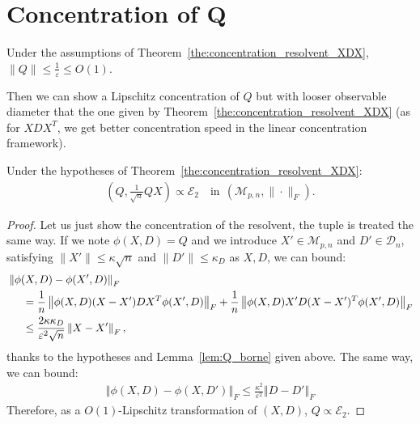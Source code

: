 \documentclass[a4papaer, titlepage]{book}
\begin{document}
 \medskip
\section{Concentration of Q}\label{app:concentration_lipschitz_Q}
 \begin{lemma}\label{lem:Q_borne}
   Under the assumptions of Theorem~\ref{the:concentration_resolvent_XDX}, $\|Q\| \leq \frac{1}{\varepsilon} \leq O(1)$.
 \end{lemma} 
 Then we can show a Lipschitz concentration of $Q$ but with looser observable diameter that the one given by Theorem~\ref{the:concentration_resolvent_XDX} (as for $XDX^T$, we get better concentration speed in the linear concentration framework).
 \begin{lemma}\label{lem:concentration_faible_resolvante}
   Under the hypotheses of Theorem~\ref{the:concentration_resolvent_XDX}: 
   \begin{align*}
      \left(Q, \frac{1}{\sqrt n} QX\right) \propto \mathcal E_2 \quad \text{in} \ \ (\mathcal M_{p,n}, \| \cdot \|_F).
    \end{align*} 
 \end{lemma}
   \begin{proof}
   Let us just show the concentration of the resolvent, the tuple is treated the same way. If we note $\phi(X,D) = Q$ and we introduce $X' \in \mathcal M_{p,n}$ and $D' \in \mathcal D_n$, satisfying $\|X'\|\leq \kappa \sqrt n$ and $\|D'\| \leq \kappa_D$ as $X,D$, we can bound:
   \begin{align*}
     &\left\Vert \phi(X,D) - \phi(X',D)\right\Vert_F\\
     &\hspace{0.5cm}= \frac{1}{n}\left\Vert \phi(X,D) (X-X') DX^T \phi(X',D)\right\Vert_F + \frac{1}{n}\left\Vert \phi(X,D) X' D(X- X')^T \phi(X',D)\right\Vert_F \\
     &\hspace{0.5cm}\leq \frac{2\kappa\kappa_D}{\varepsilon^2\sqrt n} \left\Vert X- X'\right\Vert_F,
   \end{align*}
   thanks to the hypotheses and Lemma~\ref{lem:Q_borne} given above. The same way, we can bound:
   \begin{align*}
     \left\Vert \phi(X,D) - \phi(X,D')\right\Vert_F\leq \frac{\kappa^2}{\varepsilon^2} \left\Vert D- D'\right\Vert_F
   \end{align*}
   Therefore, as a $O(1)$-Lipschitz transformation of $(X,D)$, $Q \propto \mathcal E_2$.
   \end{proof}
\end{document}
